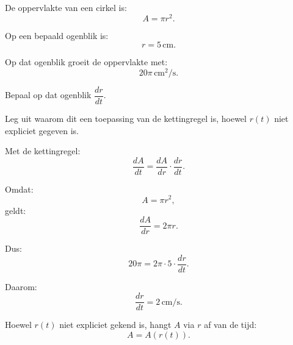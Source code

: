 \documentclass{ximera}
\begin{document}
\begin{oefening}{\oefG}

De oppervlakte van een cirkel is:
\[
A=\pi r^2.
\]

Op een bepaald ogenblik is:
\[
r=5\,\mathrm{cm}.
\]

Op dat ogenblik groeit de oppervlakte met:
\[
20\pi\,\mathrm{cm^2/s}.
\]

\begin{question}
Bepaal op dat ogenblik $\dfrac{dr}{dt}$.
\end{question}

\begin{question}
Leg uit waarom dit een toepassing van de kettingregel is, hoewel
$r(t)$ niet expliciet gegeven is.
\end{question}

\begin{oplossing}

Met de kettingregel:
\[
\frac{dA}{dt}
=
\frac{dA}{dr}\cdot\frac{dr}{dt}.
\]

Omdat:
\[
A=\pi r^2,
\]
geldt:
\[
\frac{dA}{dr}=2\pi r.
\]

Dus:
\[
20\pi
=
2\pi\cdot5\cdot\frac{dr}{dt}.
\]

Daarom:
\[
\boxed{\frac{dr}{dt}=2\,\mathrm{cm/s}.}
\]

Hoewel $r(t)$ niet expliciet gekend is, hangt $A$ via $r$ af van de tijd:
\[
A=A(r(t)).
\]

\end{oplossing}

\end{oefening}
\end{document}
